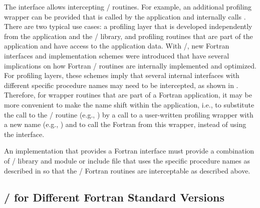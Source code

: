 \begin{users}
The  interface allows intercepting \MPI/ routines.
For example, an additional  profiling wrapper
can be provided that is called by the
application and internally calls .
There are two typical use cases: a profiling layer that is developed
independently from the application and the \MPI/ library,
and profiling routines that are part of the application
and have access to the application data.
With \MPIIIIDOTO/, new Fortran interfaces and implementation schemes
were introduced that have several implications on how Fortran
\MPI/ routines are internally implemented and optimized.
For profiling layers, these schemes imply that several
internal interfaces with different specific procedure names
may need to be intercepted,
as shown in .
Therefore, for wrapper routines that
are part of a Fortran application,
it may be more convenient to make the name shift within
the application, i.e., to substitute the call to the
\MPI/ routine (e.g., ) by a call to a user-written
profiling wrapper with a new name (e.g., )
and to call the Fortran  from this wrapper,
instead of using the  interface.
\end{users}

\begin{implementors}
  An implementation that provides a Fortran interface must provide a
  combination of \MPI/ library and module or include file that uses
  the specific procedure names as described in
  so that the \MPI/
  Fortran routines are interceptable as described above.
\end{implementors}

\subsection{\texorpdfstring{\MPI/}{MPI} for Different Fortran Standard Versions}
\label{sec:f90:different-fortran-versions}

